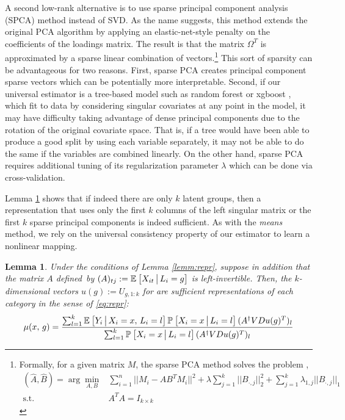 \documentclass{article}
\theoremstyle{plain}
\newtheorem{lemm}[prop]{Lemma}
\theoremstyle{definition}
\theoremstyle{remark}
\begin{document}
A second low-rank alternative is to use sparse principal component analysis (SPCA) method \cite{zou2006sparse} instead of SVD. As the name suggests, this method extends the original PCA algorithm by applying an elastic-net-style penalty on the coefficients of the loadings matrix. The result is that the matrix $\Omega^T$ is approximated by a sparse linear combination of vectors.\footnote{Formally, for a given matrix $M$, the sparse PCA method solves the problem \citep[~eq. 3.12]{zou2006sparse},
\begin{align}
    (\hat{A},\hat{B}) = \arg\min_{A,B} &\sum_{i=1}^n ||M_i - AB^TM_i||^2+ \lambda \sum_{j=1}^k ||B_{\cdot,j} ||_{2}^2 + \sum_{j=1}^k \lambda_{1,j} ||B_{\cdot,j}||_1\\
    \text{s.t.} \quad & A^TA = I_{k \times k}
    \label{eq:sparse_pca}
\end{align}
} This sort of sparsity can be advantageous for two reasons. First, sparse PCA creates principal component sparse vectors which can be potentially more interpretable. Second, if our universal estimator is a tree-based model such as random forest \cite{breiman2001random} or xgboost \cite{chen2016xgboost}, which fit to data by considering singular covariates at any point in the model, it may have difficulty taking advantage of dense principal components due to the rotation of the original covariate space. That is, if a tree would have been able to produce a good split by using each variable separately, it may not be able to do the same if the variables are combined linearly. On the other hand, sparse PCA requires additional tuning of its regularization parameter $\lambda$ which can be done via cross-validation.

Lemma \ref{lemm:lowrank} shows that if indeed there are only $k$ latent groups, then a representation that uses only the first $k$ columns of the left singular matrix or the first $k$ sparse principal components is indeed sufficient. As with the \emph{means} method, we rely on the universal consistency property of our estimator to learn a nonlinear mapping.

\begin{lemm}
\label{lemm:lowrank}
Under the conditions of Lemma \ref{lemm:repr}, suppose in addition that the matrix $A$ defined~by $(A)_{tj} := \mathbb{E}_{}\left[X_{it} \,\big|\, L_{i} = g\right]$
is left-invertible. Then, the $k$-dimensional vectors $u(g) := U_{g,1:k}$ for  are sufficient representations of each category in the sense of \eqref{eq:repr}:
\begin{equation}
\label{eq:lowrank}
  \mu(x, \, g) = \frac{\sum_{l = 1}^k  \mathbb{E}_{}\left[Y_i \,\big|\, X_i = x, \, L_i = l\right] \mathbb{P}_{}\left[X_i = x \,\big|\, L_i = l\right] (A^\dagger V D  u(g)^{T})_l}{\sum_{l = 1}^k \mathbb{P}_{}\left[X_i = x \,\big|\, L_i = l\right] (A^\dagger V D  u(g)^{T})_l  }
\end{equation}
\end{lemm}
\end{document}
